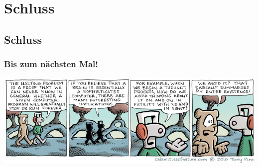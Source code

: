 \section{Schluss}
\subsection{Schluss}
\begin{frame}
\frametitle{Bis zum nächsten Mal!}
\begin{center}
  \includegraphics[width=1.59 \textheight]{images/halting.jpg}
\end{center}
\end{frame}

